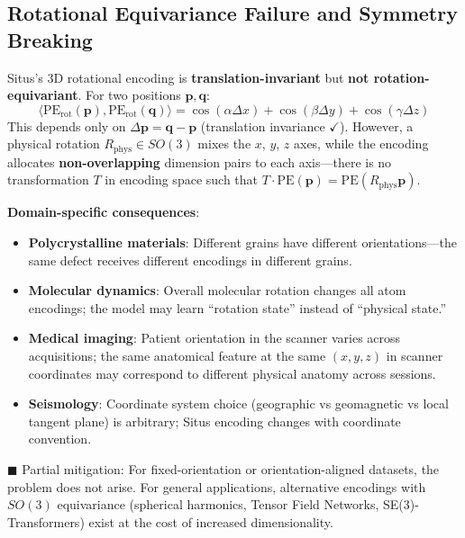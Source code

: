 \documentclass[12pt,a4paper]{article}
\begin{document}
\subsection{Rotational Equivariance Failure and Symmetry Breaking}
\label{sec:rotation}

Situs's 3D rotational encoding is \textbf{translation-invariant} but \textbf{not rotation-equivariant}. For two positions $\mathbf{p}, \mathbf{q}$:
\begin{equation}
\langle \mathrm{PE}_{\text{rot}}(\mathbf{p}), \mathrm{PE}_{\text{rot}}(\mathbf{q}) \rangle = \cos(\alpha\Delta x) + \cos(\beta\Delta y) + \cos(\gamma\Delta z)
\end{equation}
This depends only on $\Delta\mathbf{p} = \mathbf{q} - \mathbf{p}$ (translation invariance $\checkmark$). However, a physical rotation $R_{\text{phys}} \in SO(3)$ mixes the $x$, $y$, $z$ axes, while the encoding allocates \textbf{non-overlapping} dimension pairs to each axis---there is no transformation $T$ in encoding space such that $T \cdot \mathrm{PE}(\mathbf{p}) = \mathrm{PE}(R_{\text{phys}}\mathbf{p})$.

\textbf{Domain-specific consequences}:
\begin{itemize}[nosep]
\item \textbf{Polycrystalline materials}: Different grains have different orientations—the same defect receives different encodings in different grains.
\item \textbf{Molecular dynamics}: Overall molecular rotation changes all atom encodings; the model may learn ``rotation state'' instead of ``physical state.''
\item \textbf{Medical imaging}: Patient orientation in the scanner varies across acquisitions; the same anatomical feature at the same $(x,y,z)$ in scanner coordinates may correspond to different physical anatomy across sessions.
\item \textbf{Seismology}: Coordinate system choice (geographic vs geomagnetic vs local tangent plane) is arbitrary; Situs encoding changes with coordinate convention.
\end{itemize}

\textcolor{projected}{$\blacksquare$ Partial mitigation}: For fixed-orientation or orientation-aligned datasets, the problem does not arise. For general applications, alternative encodings with $SO(3)$ equivariance (spherical harmonics, Tensor Field Networks\cite{thomas2018}, SE(3)-Transformers\cite{fuchs2020}) exist at the cost of increased dimensionality.
\end{document}
